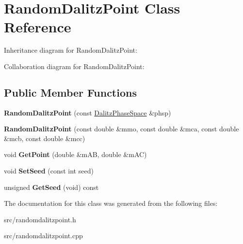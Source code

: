 \hypertarget{class_random_dalitz_point}{}\section{Random\+Dalitz\+Point Class Reference}
\label{class_random_dalitz_point}


Inheritance diagram for Random\+Dalitz\+Point\+:


Collaboration diagram for Random\+Dalitz\+Point\+:
\subsection*{Public Member Functions}
\begin{DoxyCompactItemize}
\item 
\hypertarget{class_random_dalitz_point_a163fc5d8bebce253ffc9b303e4081288}{}{\bfseries Random\+Dalitz\+Point} (const \hyperlink{class_dalitz_phase_space}{Dalitz\+Phase\+Space} \&phsp)\label{class_random_dalitz_point_a163fc5d8bebce253ffc9b303e4081288}

\item 
\hypertarget{class_random_dalitz_point_a61541a639d3d44b2f28261ba724c0dcd}{}{\bfseries Random\+Dalitz\+Point} (const double \&mmo, const double \&mca, const double \&mcb, const double \&mcc)\label{class_random_dalitz_point_a61541a639d3d44b2f28261ba724c0dcd}

\item 
\hypertarget{class_random_dalitz_point_ada797767391701a4a758ae98b40e0b08}{}void {\bfseries Get\+Point} (double \&m\+A\+B, double \&m\+A\+C)\label{class_random_dalitz_point_ada797767391701a4a758ae98b40e0b08}

\item 
\hypertarget{class_random_dalitz_point_aba17b7eadbe3666ae923e32739855b78}{}void {\bfseries Set\+Seed} (const int seed)\label{class_random_dalitz_point_aba17b7eadbe3666ae923e32739855b78}

\item 
\hypertarget{class_random_dalitz_point_a1df5c36c5aeddc5d5a834b983ceb0b9c}{}unsigned {\bfseries Get\+Seed} (void) const \label{class_random_dalitz_point_a1df5c36c5aeddc5d5a834b983ceb0b9c}

\end{DoxyCompactItemize}


The documentation for this class was generated from the following files\+:\begin{DoxyCompactItemize}
\item 
src/randomdalitzpoint.\+h\item 
src/randomdalitzpoint.\+cpp\end{DoxyCompactItemize}
